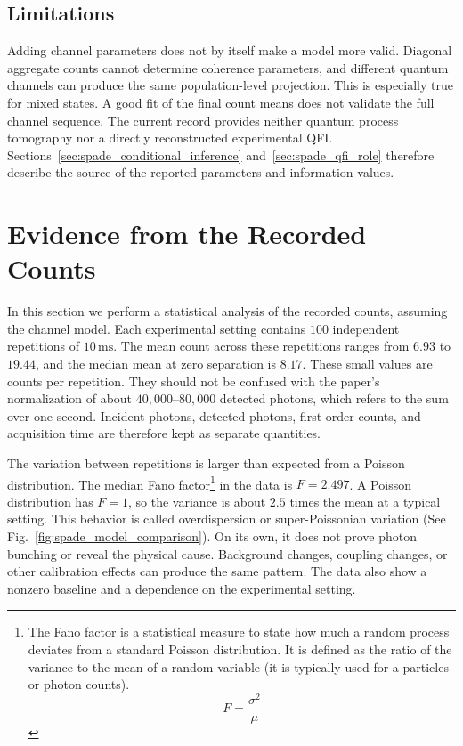 \subsection{Limitations}

Adding channel parameters does not by itself make a model more valid.  Diagonal aggregate counts cannot determine coherence parameters, and different quantum channels can produce the same population-level projection. This is especially true for mixed states.  A good fit of the final count means does not validate the full channel sequence. The current record provides neither quantum process tomography nor a directly reconstructed experimental QFI.  Sections~\ref{sec:spade_conditional_inference} and~\ref{sec:spade_qfi_role} therefore describe the source of the reported parameters and information values.

\section{Evidence from the Recorded Counts}
\label{sec:spade_data_diagnostics}

In this section we perform a statistical analysis of the recorded counts, assuming the channel model.
Each experimental setting contains $100$ independent repetitions of $10\,\mathrm{ms}$.  The mean count across these repetitions ranges from $6.93$ to $19.44$, and the median mean at zero separation is $8.17$.  These small values are counts per repetition.  They should not be confused with the paper's normalization of about $40{,}000$--$80{,}000$ detected photons, which refers to the sum over one second.  Incident photons, detected photons, first-order counts, and acquisition time are therefore kept as separate quantities.

The variation between repetitions is larger than expected from a Poisson distribution. The median Fano factor\footnote{The Fano factor is a statistical measure to state how much a random process deviates from a standard Poisson distribution. It is defined as the ratio of the variance to the mean of a random variable (it is typically used for a particles or photon counts).$$F = \frac{\sigma^2 }{\mu}$$} in the data is $F=2.497$.  A Poisson distribution has $F=1$, so the variance is about $2.5$ times the mean at a typical setting.  This behavior is called overdispersion or super-Poissonian variation (See Fig.~\ref{fig:spade_model_comparison}).  On its own, it does not prove photon bunching or reveal the physical cause.  Background changes, coupling changes, or other calibration effects can produce the same pattern.  The data also show a nonzero baseline and a dependence on the experimental setting.

